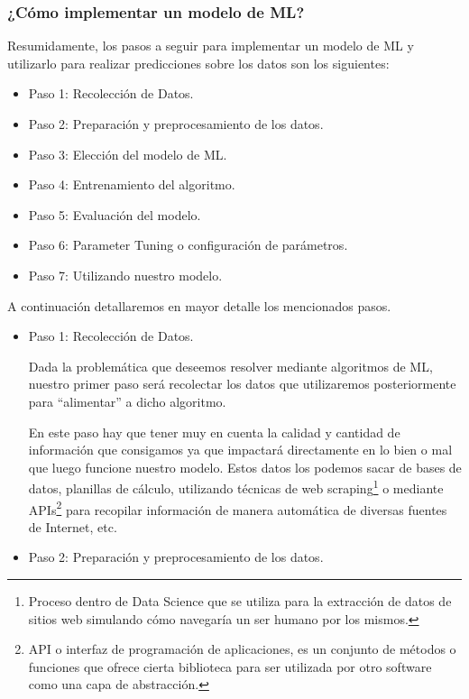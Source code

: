 \documentclass[12pt,a4paper]{article}
\begin{document}
\begin{sloppypar}
\cleardoublepage
\subsubsection{¿Cómo implementar un modelo de ML?}\label{implementar_mod_ML}

Resumidamente, los pasos a seguir para implementar un modelo de ML y utilizarlo para realizar predicciones sobre los datos son los siguientes:
\begin{itemize}
\item Paso 1: Recolección de Datos.
\item Paso 2: Preparación y preprocesamiento de los datos.
\item Paso 3: Elección del modelo de ML.
\item Paso 4: Entrenamiento del algoritmo.
\item Paso 5: Evaluación del modelo.
\item Paso 6: Parameter Tuning o configuración de parámetros.
\item Paso 7: Utilizando nuestro modelo.\\
\end{itemize}

A continuación detallaremos en mayor detalle los mencionados pasos.

\begin{itemize}
\item Paso 1: Recolección de Datos.

Dada la problemática que deseemos resolver mediante algoritmos de ML, nuestro primer paso será recolectar los datos que utilizaremos posteriormente para “alimentar” a dicho algoritmo. 

En este paso hay que tener muy en cuenta la calidad y cantidad de información que consigamos ya que impactará directamente en lo bien o mal que luego funcione nuestro modelo. Estos datos los podemos sacar de bases de datos, planillas de cálculo, utilizando técnicas de web scraping\footnote{Proceso dentro de Data Science que se utiliza para la extracción de datos de sitios web simulando cómo navegaría un ser humano por los mismos.} o mediante APIs\footnote{API o interfaz de programación de aplicaciones, es un conjunto de métodos o funciones que ofrece cierta biblioteca para ser utilizada por otro software como una capa de abstracción.} para recopilar información de manera automática de diversas fuentes de Internet, etc.\\

\item Paso 2: Preparación y preprocesamiento de los datos.


\end{itemize}
\end{sloppypar}
\end{document}
